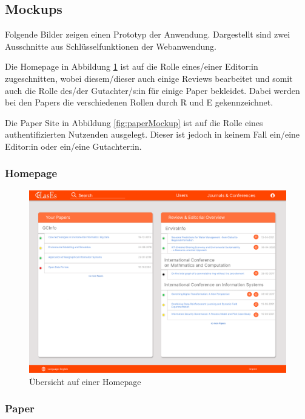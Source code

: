 \subsection{Mockups}

Folgende Bilder zeigen einen Prototyp der Anwendung.
Dargestellt sind zwei Ausschnitte aus Schlüsselfunktionen der Webanwendung.

Die Homepage in Abbildung \ref{fig:homepageMockup} ist auf die Rolle eines/einer Editor:in zugeschnitten, wobei diesem/dieser auch einige
Reviews bearbeitet und somit auch die Rolle des/der Gutachter/s:in für einige Paper bekleidet.
Dabei werden bei den Papers die verschiedenen Rollen durch R und E gekennzeichnet.

Die Paper Site in Abbildung \ref{fig:paperMockup} ist auf die Rolle eines authentifizierten Nutzenden ausgelegt.
Dieser ist jedoch in keinem Fall ein/eine Editor:in oder ein/eine Gutachter:in.


\subsubsection{Homepage}

\begin{figure}[H]
	\centering
	\includegraphics[width=\linewidth]{graphics/Homepage}
	\caption{Übersicht auf einer Homepage}
	\label{fig:homepageMockup}
\end{figure}

\subsubsection{Paper}

